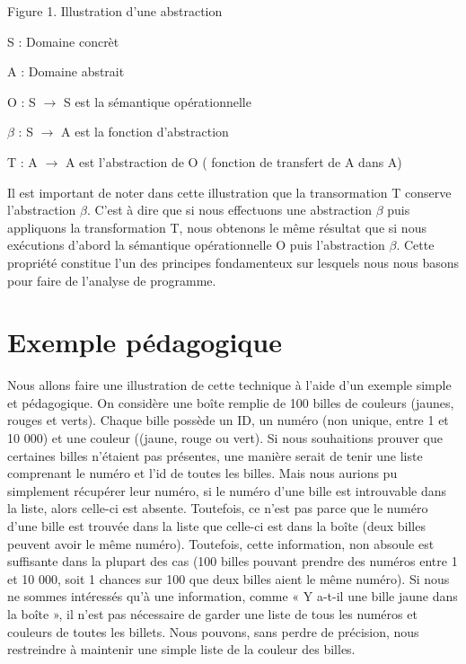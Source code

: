 \documentclass[french]{report}
\begin{document}
 \begin{center}Figure 1. Illustration d'une abstraction \end{center}

\begin{description}
  \item S : Domaine concrèt
    \item A : Domaine abstrait
    \item O : S $\rightarrow$ S est la sémantique opérationnelle
    \item $\beta$ : S $\rightarrow$ A est la fonction d'abstraction
    \item T : A $\rightarrow$ A est l'abstraction de O ( fonction de transfert de A dans A)
\end{description}

Il est important de noter dans cette illustration que la transormation T conserve l'abstraction $\beta$. C'est à dire que si nous effectuons une abstraction $\beta$ puis appliquons la transformation T, nous obtenons le même résultat que si nous exécutions d'abord la sémantique opérationnelle O puis l'abstraction $\beta$. Cette propriété constitue l'un des principes fondamenteux sur lesquels nous nous basons pour faire de l'analyse de programme.

\section{Exemple pédagogique}

Nous allons faire une illustration de cette technique à l'aide d'un exemple simple et pédagogique. On considère une boîte remplie de 100 billes de couleurs (jaunes, rouges et verts).
Chaque bille possède un ID, un numéro (non unique, entre 1 et 10 000)
et une couleur ((jaune, rouge ou vert).
Si nous souhaitions prouver que certaines billes n'étaient pas présentes, une manière serait
de tenir une liste comprenant le numéro et l'id de toutes les billes.
Mais nous aurions pu simplement récupérer leur numéro, si le numéro d'une bille est introuvable dans la liste,
alors celle-ci est absente. Toutefois, ce n'est pas parce que le numéro d'une bille est
trouvée dans la liste que celle-ci est dans la boîte (deux billes peuvent avoir le
même numéro). Toutefois, cette information, non absoule est suffisante dans la plupart
des cas (100 billes pouvant prendre des numéros entre 1 et 10 000, soit 1 chances sur 100 que deux billes aient
le même numéro).
Si nous ne sommes intéressés qu'à une information,
comme « Y a-t-il une bille jaune dans la boîte », il n'est
pas nécessaire de garder une liste de tous les numéros et couleurs de toutes les billets.
Nous pouvons, sans perdre de précision, nous
restreindre à maintenir une simple liste de la couleur des billes.
\end{document}
